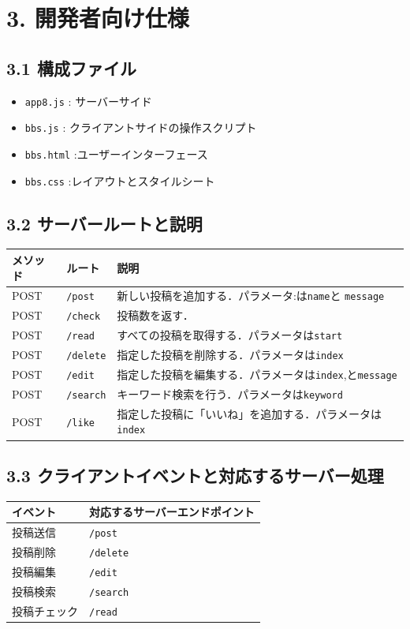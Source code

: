 \documentclass[uplatex,dvipdfmx]{jsarticle}
\begin{document}
\section*{3. 開発者向け仕様}
\subsection*{3.1 構成ファイル}
\begin{itemize}
\item \texttt{app8.js} : サーバーサイド
\item \texttt{bbs.js} : クライアントサイドの操作スクリプト
\item \texttt{bbs.html} :ユーザーインターフェース
\item \texttt{bbs.css} :レイアウトとスタイルシート
\end{itemize}

\subsection*{3.2 サーバールートと説明}
\begin{longtable}{|l|l|p{8cm}|}
\hline
\textbf{メソッド} & \textbf{ルート} & \textbf{説明} \\
\hline
POST & \texttt{/post} & 新しい投稿を追加する．パラメータ:は\texttt{name}と \texttt{message} \\
\hline
POST & \texttt{/check} & 投稿数を返す． \\
\hline
POST & \texttt{/read} & すべての投稿を取得する．パラメータは\texttt{start} \\
\hline
POST & \texttt{/delete} & 指定した投稿を削除する．パラメータは\texttt{index} \\
\hline
POST & \texttt{/edit} & 指定した投稿を編集する．パラメータは\texttt{index},と\texttt{message} \\
\hline
POST & \texttt{/search} & キーワード検索を行う．パラメータは\texttt{keyword} \\
\hline
POST & \texttt{/like} & 指定した投稿に「いいね」を追加する．パラメータは\texttt{index} \\
\hline
\end{longtable}

\subsection*{3.3 クライアントイベントと対応するサーバー処理}
\begin{longtable}{|l|l|}
\hline
\textbf{イベント} & \textbf{対応するサーバーエンドポイント} \\
\hline
投稿送信 & \texttt{/post} \\
\hline
投稿削除 & \texttt{/delete} \\
\hline
投稿編集 & \texttt{/edit} \\
\hline
投稿検索 & \texttt{/search} \\
\hline
投稿チェック & \texttt{/read} \\
\hline
\end{longtable}
\end{document}
